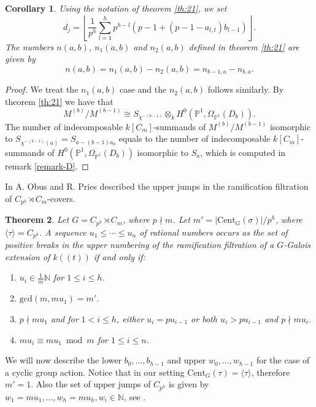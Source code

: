\documentclass[11pt,letterpaper]{amsart}
\newtheorem{theorem}{Theorem}
\newtheorem{corollary}[theorem]{Corollary}
\theoremstyle{definition}
\newcommand{\lf}{\left\lfloor}
\newcommand{\rf}{\right\rfloor}
\renewcommand{\mod}{\bmod}
\begin{document}
\begin{corollary}
\label{cor:6}
Using the notation of theorem \ref{th:21}, we set
\begin{equation}
    \label{eq:defdj}
d_j=\lf
\frac{1}{p^{h}} \sum_{l=1}^h
p^{h-l} 
(p-1+ (p-1-a_{l,t})b_{l-1})
\rf.
\end{equation}
The numbers $n(a,b)$, $n_1(a,b)$ and $n_2(a,b)$ defined in theorem \ref{th:21} are given by
\[
  n(a,b)=n_1(a,b)-n_2(a,b)=n_{b-1,a} -n_{b,a}.
\]
\end{corollary}
\begin{proof}
We treat the $n_1(a,b)$ case and the $n_2(a,b)$ follows similarly.
By {theorem \ref{th:21}} 
we have that 
\[
  M^{(b)}/M^{(b-1)} \cong S_{\chi^{-(b-1)}} \otimes_k H^0(\mathbb{P}^1,\Omega_{\mathbb{P}^1}(D_b)).
\]
The number of indecomposable $k[C_m]$-summands of $M^{(b)}/M^{(b-1)}$ isomorphic to 
$S_{ {\chi^{-(b-1)}(a)}}=S_{a -(b-1)a_0}$ equals to the number of indecomposable $k[C_m]$-summands of $H^0(\mathbb{P}^1,\Omega_{\mathbb{P}^1}(D_{b}))$ isomorphic to $S_a$, which is computed in remark \ref{remark-D}.
\end{proof}
In \cite[Th. 1.1]{MR2577662} A. Obus and R. Pries described the upper jumps in the ramification filtration of $C_{p^h} \rtimes C_m$-covers. 
\begin{theorem}
Let $G=C_{p^h} \rtimes C_m$, where $p\nmid m$. Let $m'= |\mathrm{Cent}_G(\sigma)|/p^h$, where $\langle \tau \rangle= C_{p^h}$. A sequence $u_1 \leq \cdots \leq u_n$ of rational numbers occurs as the set of positive breaks in the upper numbering of the ramification filtration of a $G$-Galois extension of $k( (t))$ if and only if:
\begin{enumerate}
\item $u_i \in \frac{1}{m}\mathbb{N}$ for $1\leq i \leq h$.
\item $\mathrm{gcd}(m,mu_1)=m'$.
\item $p\nmid mu_1$ and for $1 < i \leq h$, either $u_i=p u_{i-1}$ or both $u_i > p u_{i-1}$ and $p\nmid m u_i$.
\item $m u_i \equiv m u_1 \mod m$ for $1 \leq i \leq n$.
\end{enumerate}
\end{theorem}
{We will now describe the lower  $b_0, \ldots , b_{h-1}$ and upper $w_0, \ldots , w_{h-1}$ for the case of a cyclic group action.  
}
Notice that in our setting $\mathrm{Cent}_G(\tau)=\langle \tau \rangle$, therefore $m'=1$. Also the set of upper jumps of $C_{p^h}$ is given by $w_1= mu_1,\ldots, w_h=m u_h, w_i \in \mathbb{N}$, see \cite[lemma 3.5]{MR2577662}. 
\end{document}
